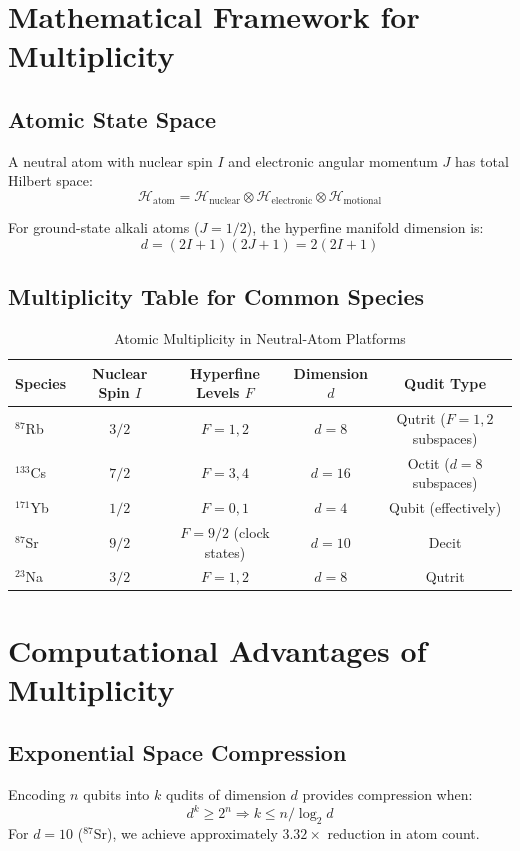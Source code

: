 \documentclass[12pt,twocolumn]{article}
\begin{document}
\section{Mathematical Framework for Multiplicity}

\subsection{Atomic State Space}
A neutral atom with nuclear spin $I$ and electronic angular momentum $J$ has total Hilbert space:
\[
\mathcal{H}_{\text{atom}} = \mathcal{H}_{\text{nuclear}} \otimes \mathcal{H}_{\text{electronic}} \otimes \mathcal{H}_{\text{motional}}
\]

For ground-state alkali atoms ($J=1/2$), the hyperfine manifold dimension is:
\[
d = (2I+1)(2J+1) = 2(2I+1)
\]

\subsection{Multiplicity Table for Common Species}

\begin{table}[H]
\centering
\caption{Atomic Multiplicity in Neutral-Atom Platforms}
\begin{tabular}{lcccc}
\toprule
\textbf{Species} & \textbf{Nuclear Spin } $I$ & \textbf{Hyperfine Levels} $F$ & \textbf{Dimension } $d$ & \textbf{Qudit Type} \\
\midrule
$^{87}$Rb & $3/2$ & $F=1,2$ & $d=8$ & Qutrit ($F=1,2$ subspaces) \\
$^{133}$Cs & $7/2$ & $F=3,4$ & $d=16$ & Octit ($d=8$ subspaces) \\
$^{171}$Yb & $1/2$ & $F=0,1$ & $d=4$ & Qubit (effectively) \\
$^{87}$Sr & $9/2$ & $F=9/2$ (clock states) & $d=10$ & Decit \\
$^{23}$Na & $3/2$ & $F=1,2$ & $d=8$ & Qutrit \\
\bottomrule
\end{tabular}
\end{table}

\section{Computational Advantages of Multiplicity}

\subsection{Exponential Space Compression}
Encoding $n$ qubits into $k$ qudits of dimension $d$ provides compression when:
\[
d^k \geq 2^n \Rightarrow k \leq n / \log_2 d
\]
For $d=10$ ($^{87}\text{Sr}$), we achieve approximately $3.32\times$ reduction in atom count.
\end{document}
